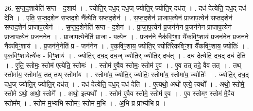 \documentclass[17pt]{extarticle}
\begin{document}
26. स॒प्त॒द॒शायेति॑ सप्त - द॒शाय॑ । . ज्योति॒र् दध॒द् दध॒ज् ज्योति॒र् ज्योति॒र् दध॑त् । . दध॑ देत्येति॒ दध॒द् दध॑ देति । . ए॒ति॒ स॒प्त॒द॒शेन॑ सप्तद॒शे नै᳚त्येति सप्तद॒शेन॑ । . स॒प्त॒द॒शेन॑ प्राजाप॒त्येन॑ प्राजाप॒त्येन॑ सप्तद॒शेन॑ सप्तद॒शेन॑ प्राजाप॒त्येन॑ । . स॒प्त॒द॒शेनेति॑ सप्त - द॒शेन॑ । . प्रा॒जा॒प॒त्येन॑ प्र॒जन॑नेन प्र॒जन॑नेन प्राजाप॒त्येन॑ प्राजाप॒त्येन॑ प्र॒जन॑नेन । . प्रा॒जा॒प॒त्येनेति॑ प्राजा - प॒त्येन॑ । . प्र॒जन॑ने नैक॑विꣳ॒॒शा यै॑कविꣳ॒॒शाय॑ प्र॒जन॑नेन प्र॒जन॑ने नैक॑विꣳ॒॒शाय॑ । . प्र॒जन॑ने॒नेति॑ प्र - जन॑नेन । . ए॒क॒विꣳ॒॒शाय॒ ज्योति॒र् ज्योति॑रेकविꣳ॒॒शा यै॑कविꣳ॒॒शाय॒ ज्योतिः॑ । . ए॒क॒विꣳ॒॒शायेत्ये॑क - विꣳ॒॒शाय॑ । . ज्योति॒र् दध॒द् दध॒ज् ज्योति॒र् ज्योति॒र् दध॑त् । . दध॑ देत्येति॒ दध॒द् दध॑ देति । . ए॒ति॒ स्तोमः॒ स्तोम॑ एत्येति॒ स्तोमः॑ । . स्तोम॑ ए॒वैव स्तोमः॒ स्तोम॑ ए॒व । . ए॒व तत् तदे॒ वैव तत् । . तथ् स्तोमा॑य॒ स्तोमा॑य॒ तत् तथ् स्तोमा॑य । . स्तोमा॑य॒ ज्योति॒र् ज्योतिः॒ स्तोमा॑य॒ स्तोमा॑य॒ ज्योतिः॑ । . ज्योति॒र् दध॒द् दध॒ज् ज्योति॒र् ज्योति॒र् दध॑त् । . दध॑ देत्येति॒ दध॒द् दध॑ देति । . ए॒त्यथो॒ अथो॑ एत्ये॒ त्यथो᳚ । . अथो॒ स्तोमे॒ स्तोमे ऽथो॒ अथो॒ स्तोमे᳚ । . अथो॒ इत्यथो᳚ । . स्तोम॑ ए॒वैव स्तोमे॒ स्तोम॑ ए॒व । . ए॒व स्तोमꣳ॒॒ स्तोम॑ मे॒वैव स्तोम᳚म् । . स्तोम॑ म॒भ्य॑भि स्तोमꣳ॒॒ स्तोम॑ म॒भि । . अ॒भि प्र प्राभ्य॑भि प्र । \newline
\end{document}
